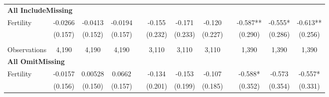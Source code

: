 \begin{landscape}
\begin{table}[htpb!]
\begin{center}
\begin{tabular}{lcccp{2mm}cccp{2mm}ccc}
\multicolumn{12}{l}{\textbf{All IncludeMissing}}\\ 
Fertility&-0.0266&-0.0413&-0.0194&&-0.155&-0.171&-0.120&&-0.587**&-0.555*&-0.613**\\
&(0.157)&(0.152)&(0.157)&&(0.232)&(0.233)&(0.227)&&(0.290)&(0.286)&(0.256)\\
\begin{footnotesize}\end{footnotesize}&\begin{footnotesize}\end{footnotesize}&\begin{footnotesize}\end{footnotesize}&\begin{footnotesize}\end{footnotesize}&\begin{footnotesize}\end{footnotesize}&\begin{footnotesize}\end{footnotesize}&\begin{footnotesize}\end{footnotesize}&\begin{footnotesize}\end{footnotesize}&\begin{footnotesize}\end{footnotesize}&\begin{footnotesize}\end{footnotesize}&\begin{footnotesize}\end{footnotesize}&\begin{footnotesize}\end{footnotesize}\\Observations&4,190&4,190&4,190&&3,110&3,110&3,110&&1,390&1,390&1,390\\
\multicolumn{12}{l}{\textbf{All OmitMissing}}\\ 
Fertility&-0.0157&0.00528&0.0662&&-0.134&-0.153&-0.107&&-0.588*&-0.573&-0.557*\\
&(0.156)&(0.150)&(0.157)&&(0.201)&(0.199)&(0.185)&&(0.352)&(0.354)&(0.331)\\

\end{tabular}
\end{center}
\end{table}
\end{landscape}
